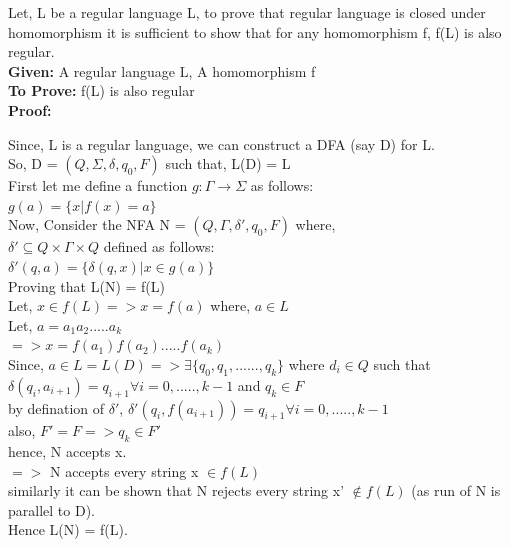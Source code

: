 \documentclass{article}
\begin{document}
\begin{enumerate}
    Let, L be a regular language L, to prove that regular language is closed under homomorphism it is sufficient to
    show that for any homomorphism f, f(L) is also regular.\\
    \textbf{Given:} A regular language L, A homomorphism f\\
    \textbf{To Prove:} f(L) is also regular\\
    \textbf{Proof:}

    Since, L is a regular language, we can construct a DFA (say D) for L.\\
    So, D = {$(Q, \Sigma, \delta, q_0 , F )$} such that, L(D) = L\\
    First let me define a function $g: \Gamma \to \Sigma$ as follows:\\
    $g(a) = \{ x | f(x) = a \} $\\

    Now, Consider the NFA N = {$(Q, \Gamma, \delta', q_0 , F)$} where, \\
    $\delta' \subseteq Q \times \Gamma \times Q$ defined as follows:\\
    $ \delta' (q,a) = \{ \delta (q,x) | x \in g(a) \} $\\

    Proving that L(N) = f(L) \\
    Let, $x \in f(L) => x = f(a) $ where, $a \in L$\\
    Let, $a = a_1 a_2..... a_k$\\
    $=> x = f(a_1) f(a_2) ..... f(a_k)$ \\
    Since, $a \in L = L(D) => \exists \{q_0, q_1,......,q_k\}$ where $d_i \in Q$ such that\\
    $\delta (q_i,a_{i+1}) = q_{i+1} \forall i = 0,.....,k-1$ and $q_k \in F$\\
    by defination of $\delta'$, $\delta' (q_i,f(a_{i+1})) = q_{i+1} \forall i = 0,.....,k-1$\\
    also, $F' = F => q_k \in F'$\\
    hence, N accepts x.\\
    $=> $ N accepts every string x $\in f(L) $\\
    similarly it can be shown that N rejects every string x' $ \notin f(L) $ (as run of N is parallel to D).\\
    Hence L(N) = f(L).

\end{enumerate}
\end{document}
